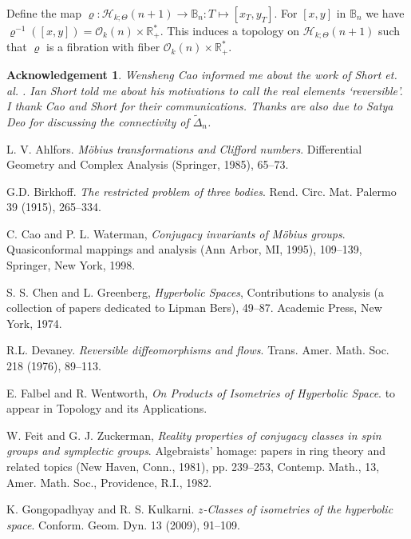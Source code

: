 \documentclass[11pt]{amsart}
\theoremstyle{definition}
\theoremstyle{remark}
\numberwithin{equation}{section}
\theoremstyle{plain}
\newtheorem*{acknowledgement}{Acknowledgement}
\begin{document}
 Define the map $\varrho: {\mathcal H}_{k; \Theta}(n+1) \to {\mathbb B}_n: T \mapsto [x_T, y_T]$.  For $[x,y]$ in ${\mathbb B}_n$ we have $\varrho^{-1}([x,y])={\mathcal O}_{k}(n)\times {\mathbb R}_+^{\ast}$. This induces a topology on ${\mathcal H}_{k;   \Theta}(n+1)$ such that  $\varrho$ is a fibration with fiber ${\mathcal O}_{k}(n) \times {\mathbb R}_+^{\ast}$. 

\begin{acknowledgement}
 Wensheng Cao informed me about the work of Short et. al. \cite{sh1, sh2}. Ian Short told me about  his motivations \cite{bir, d} to call the real elements `reversible'.  I thank Cao and Short for their communications. Thanks are also due to Satya Deo for discussing the connectivity of $\tilde \Delta_n$.  
\end{acknowledgement}
\begin{thebibliography}{99}

 L. V. Ahlfors. {\it M\"obius transformations and
  Clifford numbers}. Differential Geometry and Complex Analysis
  (Springer, 1985),  65--73.

 G.D. Birkhoff. {\it The restricted problem of three bodies}. Rend. Circ.
Mat. Palermo 39 (1915), 265--334.
  
 C. Cao and P. L. Waterman, {\it Conjugacy invariants of M\"obius groups}.  Quasiconformal mappings and analysis (Ann Arbor, MI, 1995),  109--139, Springer, New York, 1998.

S. S. Chen and L. Greenberg, {\it Hyperbolic Spaces},   Contributions to analysis (a collection of papers dedicated to Lipman Bers),  49--87. Academic Press, New York, 1974.

 R.L. Devaney. {\it Reversible diffeomorphisms and flows}. Trans. 
Amer. Math. Soc. 218 (1976), 89--113.

 E. Falbel and R. Wentworth, {\it On Products of Isometries of Hyperbolic Space}. to appear in Topology and its Applications. 

W. Feit and G. J. Zuckerman, 
{\it Reality properties of conjugacy classes in spin groups and symplectic groups}. Algebraists' homage: papers in ring theory and related topics (New Haven, Conn., 1981), pp. 239--253, Contemp. Math., 13, Amer. Math. Soc., Providence, R.I., 1982. 

K. Gongopadhyay and R. S. Kulkarni. {\it $z$-Classes of isometries of the hyperbolic space}. Conform. Geom. Dyn. 13  (2009), 91--109.


\end{thebibliography}
\end{document}
